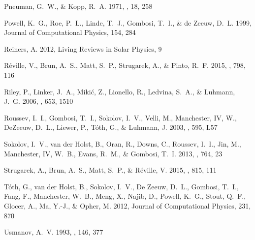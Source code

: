 \documentclass[apj]{emulateapj}
\begin{document}
\begin{thebibliography}{42}
{Pneuman}, G.~W., \& {Kopp}, R.~A. 1971, \solphys, 18, 258

{Powell}, K.~G., {Roe}, P.~L., {Linde}, T.~J., {Gombosi}, T.~I., \& {de Zeeuw},
  D.~L. 1999, Journal of Computational Physics, 154, 284

{Reiners}, A. 2012, Living Reviews in Solar Physics, 9

{R{\'e}ville}, V., {Brun}, A.~S., {Matt}, S.~P., {Strugarek}, A., \& {Pinto},
  R.~F. 2015, \apj, 798, 116

{Riley}, P., {Linker}, J.~A., {Miki{\'c}}, Z., {Lionello}, R., {Ledvina},
  S.~A., \& {Luhmann}, J.~G. 2006, \apj, 653, 1510

{Roussev}, I.~I., {Gombosi}, T.~I., {Sokolov}, I.~V., {Velli}, M.,
  {Manchester}, IV, W., {DeZeeuw}, D.~L., {Liewer}, P., {T{\'o}th}, G., \&
  {Luhmann}, J. 2003, \apjl, 595, L57

{Sokolov}, I.~V., {van der Holst}, B., {Oran}, R., {Downs}, C., {Roussev},
  I.~I., {Jin}, M., {Manchester}, IV, W.~B., {Evans}, R.~M., \& {Gombosi},
  T.~I. 2013, \apj, 764, 23

{Strugarek}, A., {Brun}, A.~S., {Matt}, S.~P., \& {R{\'e}ville}, V. 2015, \apj,
  815, 111

{T{\'o}th}, G., {van der Holst}, B., {Sokolov}, I.~V., {De Zeeuw}, D.~L.,
  {Gombosi}, T.~I., {Fang}, F., {Manchester}, W.~B., {Meng}, X., {Najib}, D.,
  {Powell}, K.~G., {Stout}, Q.~F., {Glocer}, A., {Ma}, Y.-J., \& {Opher}, M.
  2012, Journal of Computational Physics, 231, 870

{Usmanov}, A.~V. 1993, \solphys, 146, 377


\end{thebibliography}
\end{document}
